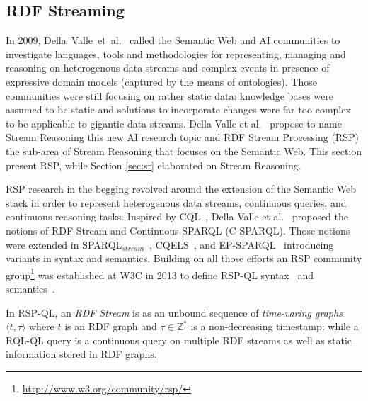 \subsection{RDF Streaming}\label{sec:rdf} %


In 2009, Della~Valle~et~al.~\cite{DBLP:journals/expert/ValleCHF09} called the Semantic Web and AI communities to investigate languages, tools and methodologies for representing, managing and reasoning on heterogenous data streams and complex events in presence of expressive domain models (captured by the means of ontologies). Those communities were still focusing on rather static data: knowledge bases were assumed to be static and solutions to incorporate changes were far too complex to be applicable to gigantic data streams. 
Della Valle et al.~\cite{DellAglioDataScience2017} propose to name Stream Reasoning this new AI research topic and RDF Stream Processing (RSP) \cite{DBLP:conf/debs/ValleDM16} the sub-area of Stream Reasoning that focuses on the Semantic Web. This section present RSP, while Section \ref{sec:sr} elaborated on Stream Reasoning.


\sloppy RSP research in the begging revolved around the extension of the Semantic Web stack \cite{DBLP:books/daglib/0036180} in order to represent heterogenous data streams, continuous queries, and continuous reasoning tasks. Inspired by CQL~\cite{arasu_widom_2004}, Della Valle et al.~\cite{DBLP:conf/fis/ValleCBBC08} proposed the notions of RDF Stream and Continuous SPARQL (C-SPARQL). Those notions were extended in SPARQL$_{stream}$~\cite{Calbimonte2010}, CQELS~\cite{LePhuoc2012c}, and EP-SPARQL~\cite{DBLP:journals/semweb/AnicicRFS12} introducing variants in syntax and semantics. Building on all those efforts an RSP community group\footnote{\url{http://www.w3.org/community/rsp/}} was established at W3C in 2013  to define RSP-QL syntax~\cite{DBLP:conf/esws/DellAglioCVC15} and semantics~\cite{DBLP:journals/ijswis/DellAglioVCC14}.

In RSP-QL, an \textit{RDF Stream} is as an unbound sequence of \emph{time-varing graphs} $\langle t,\tau\rangle$ where $t$ is an RDF graph and $\tau \in \mathbb{Z}^{*}$ is a non-decreasing timestamp; while a RQL-QL query is a continuous query on multiple RDF streams as well as static information stored in RDF graphs. 

